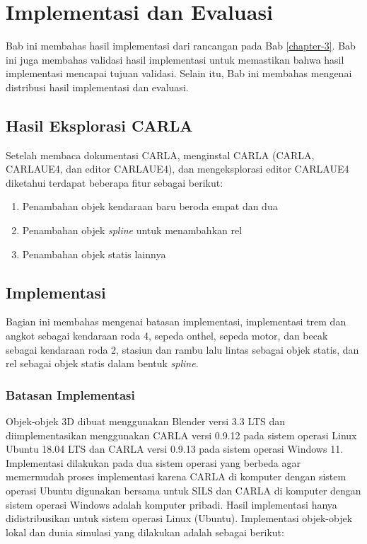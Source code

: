 \chapter{Implementasi dan Evaluasi}

Bab ini membahas hasil implementasi dari rancangan pada Bab \ref{chapter-3}. Bab
ini juga membahas validasi hasil implementasi untuk memastikan bahwa hasil
implementasi mencapai tujuan validasi. Selain itu, Bab ini membahas mengenai
distribusi hasil implementasi dan evaluasi.

\section{Hasil Eksplorasi CARLA}

Setelah membaca dokumentasi CARLA, menginstal CARLA (CARLA, CARLAUE4, dan editor
CARLAUE4), dan mengeksplorasi editor CARLAUE4 diketahui terdapat beberapa fitur
sebagai berikut:

\begin{enumerate}
    \item Penambahan objek kendaraan baru beroda empat dan dua
    \item Penambahan objek \textit{spline} untuk menambahkan rel
    \item Penambahan objek statis lainnya
\end{enumerate}


\section{Implementasi}

Bagian ini membahas mengenai batasan implementasi, implementasi trem dan angkot
sebagai kendaraan roda 4, sepeda onthel, sepeda motor, dan becak sebagai
kendaraan roda 2, stasiun dan rambu lalu lintas sebagai objek statis, dan rel
sebagai objek statis dalam bentuk \textit{spline}.

\subsection{Batasan Implementasi}

Objek-objek 3D dibuat menggunakan Blender versi 3.3 LTS dan diimplementasikan
menggunakan CARLA versi 0.9.12 pada sistem operasi Linux Ubuntu 18.04 LTS dan
CARLA versi 0.9.13 pada sistem operasi Windows 11. Implementasi dilakukan pada
dua sistem operasi yang berbeda agar memermudah proses implementasi karena CARLA
di komputer dengan sistem operasi Ubuntu digunakan bersama untuk SILS dan CARLA
di komputer dengan sistem operasi Windows adalah komputer pribadi. Hasil
implementasi hanya didistribusikan untuk sistem operasi Linux (Ubuntu).
Implementasi objek-objek lokal dan dunia simulasi yang dilakukan adalah sebagai
berikut:

